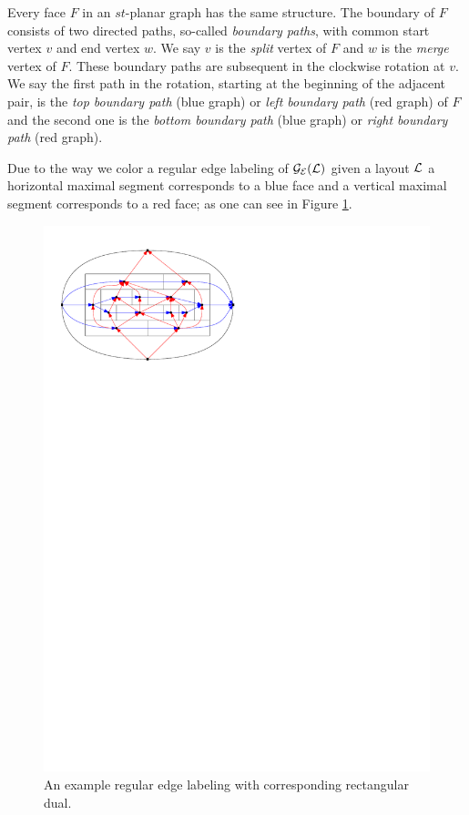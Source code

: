     Every face $F$ in an $st$-planar graph has the same structure. The boundary of $F$ consists of two directed paths, so-called \emph{boundary paths}, with common start vertex $v$ and end vertex $w$. We say $v$ is the \emph{split} vertex of $F$ and $w$ is the \emph{merge} vertex of $F$.
    These boundary paths are subsequent in the clockwise rotation at $v$. We say the first path in the rotation, starting at the beginning of the adjacent pair, is the \emph{top boundary path} (blue graph) or \emph{left boundary path} (red graph) of $F$ and the second one is the \emph{bottom boundary path} (blue graph) or \emph{right boundary path} (red graph).


    Due to the way we color a regular edge labeling of $\mathcal{G}_{\mathcal{E}}(\mathcal{L})$ given a layout $\mathcal{L}$ a horizontal maximal segment corresponds to a blue face and a vertical maximal segment corresponds to a red face; as one can see in Figure \ref{fig:rect:relSegmentFace}.

    \begin{figure}[t]
      \centering
      \includegraphics[scale=1]{rectangularDuals/img/relSegmentFaceRescale}
      \caption{An example regular edge labeling with corresponding rectangular dual.}
      \label{fig:rect:relSegmentFace}
    \end{figure}

